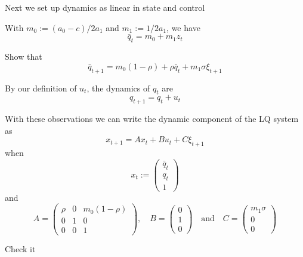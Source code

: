 \begin{frame}
    

    Next we set up dynamics as linear in state and control
    
        \vspace{0.5em}
        \vspace{0.5em}
    With $m_0 := (a_0 - c) / 2a_1$ and $m_1 := 1 / 2 a_1$, we have
    $$\bar q_t = m_0 + m_1 z_t$$

    \Ex Show that
    \begin{equation*}
       \bar q_{t+1} = m_0 (1 - \rho) + \rho \bar q_t + m_1 \sigma \xi_{t+1}
    \end{equation*}

        \vspace{0.5em}
        \vspace{0.5em}
    By our definition of $u_t$, the dynamics of $q_t$ are 
    $$
        q_{t+1} = q_t + u_t
    $$

\end{frame}


\begin{frame}
    
    With these observations we can write the dynamic component of the LQ system as
    $$
        x_{t+1} = A x_t + B u_t + C \xi_{t+1}
    $$ 
    when
    $$
        x_t := 
        \begin{pmatrix}
        \bar q_t \\
        q_t \\ 
        1
        \end{pmatrix}
    $$
    and
    $$
    A =
    \begin{pmatrix}
        \rho & 0 & m_0 (1 - \rho)
        \\
        0 & 1 &         0
        \\
        0 & 0 &         1
    \end{pmatrix},
    \quad
    B =
    \begin{pmatrix}
        0
        \\
        1
        \\
        0
    \end{pmatrix}
    \quad \text{and} \quad
    C =
    \begin{pmatrix}
    m_1 \sigma
    \\
     0
     \\
     0
    \end{pmatrix}
    $$
   

    \Ex Check it

\end{frame}



